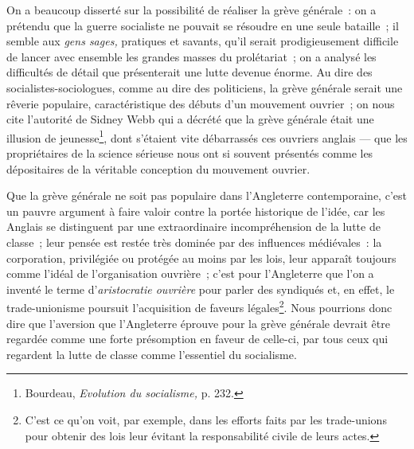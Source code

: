 \documentclass[french,twoside]{book} %
\begin{document}
On a beaucoup disserté sur la possibilité de réaliser la grève générale : on a prétendu que la guerre socialiste ne pouvait se résoudre en une seule bataille ; il semble  aux \emph{gens sages,} pratiques et savants, qu’il serait prodigieusement difficile de lancer avec ensemble les grandes masses du prolétariat ; on a analysé les difficultés de détail que présenterait une lutte devenue énorme. Au dire des socialistes-sociologues, comme au dire des politiciens, la grève générale serait une rêverie populaire, caractéristique des débuts d’un mouvement ouvrier ; on nous cite l’autorité de Sidney Webb qui a décrété que la grève générale était une illusion de jeunesse\footnote{ \noindent Bourdeau, \emph{Evolution du socialisme,} p. 232.
 }, dont s’étaient vite débarrassés ces ouvriers anglais — que les propriétaires de la science sérieuse nous ont si souvent présentés comme les dépositaires de la véritable conception du mouvement ouvrier.\par
Que la grève générale ne soit pas populaire dans l’Angleterre contemporaine, c’est un pauvre argument à faire valoir contre la portée historique de l’idée, car les Anglais se distinguent par une extraordinaire incompréhension de la lutte de classe ; leur pensée est restée très dominée par des influences médiévales : la corporation, privilégiée ou protégée au moins par les lois, leur apparaît toujours comme l’idéal de l’organisation ouvrière ; c’est pour l’Angleterre que l’on a inventé le terme d’\emph{aristocratie ouvrière} pour parler des syndiqués et, en effet, le trade-unionisme poursuit l’acquisition de faveurs légales\footnote{ \noindent C’est ce qu’on voit, par exemple, dans les efforts faits par les trade-unions pour obtenir des lois leur évitant la responsabilité civile de leurs actes.
 }. Nous pourrions donc dire que l’aversion que l’Angleterre éprouve pour la grève générale devrait être regardée  comme une forte présomption en faveur de celle-ci, par tous ceux qui regardent la lutte de classe comme l’essentiel du socialisme.\par
\end{document}
